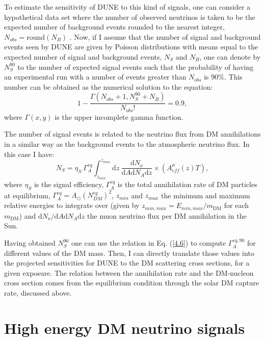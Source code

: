 To estimate the sensitivity of DUNE to this kind of signals, one can consider a hypothetical data set where the number of observed neutrinos is taken to be the expected number of background events rounded to the nearest integer, $N_{obs} = \mathrm{round}(N_{B})$ \cite{Cowan2010}. Now, if I assume that the number of signal and background events seen by DUNE are given by Poisson distributions with means equal to the expected number of signal and background events, $N_{S}$ and $N_{B}$, one can denote by $N_{S}^{90}$ to the number of expected signal events such that the probability of having an experimental run with a number of events greater than $N_{obs}$ is $90\%$. This number can be obtained as the numerical solution to the equation:
\begin{equation}\label{4.5}
	1 - \frac{\Gamma\left(N_{obs}+1, N_{S}^{90}+N_{B}\right)}{N_{obs}!} = 0.9,
\end{equation}
where $\Gamma(x,y)$ is the upper incomplete gamma function.

The number of signal events is related to the neutrino flux from DM annihilations in a similar way as the background events to the atmospheric neutrino flux. In this case I have:
\begin{equation}\label{4.6}
	N_{S} = \eta_{S} \ \Gamma_{A}^{eq} \int_{z_{min}}^{z_{max}} \mathrm{d}z \ \frac{\mathrm{d}N_{\nu}}{\mathrm{d}A \mathrm{d}N_{A} \mathrm{d}z}  \times \left(A_{eff}^{\mu}(z) T\right),
\end{equation}
where $\eta_{S}$ is the signal efficiency, $\Gamma_{A}^{eq}$ is the total annihilation rate of DM particles at equilibrium, $\Gamma_{A}^{eq} = A_{\odot} \left(N_{DM}^{eq}\right)^{2}$, $z_{min}$ and $z_{max}$ the minimum and maximum relative energies to integrate over (given by $z_{min, max} = E_{min, max}/m_{\mathrm{DM}}$ for each $m_{\mathrm{DM}}$) and $\mathrm{d}N_{\nu}/\mathrm{d}A \mathrm{d}N_{A} \mathrm{d}z$ the muon neutrino flux per DM annihilation in the Sun.

Having obtained $N_{S}^{90}$ one can use the relation in Eq. (\ref{4.6}) to compute $\Gamma_{A}^{eq,90}$ for different values of the DM mass. Then, I can directly translate those values into the projected sensitivities for DUNE to the DM scattering cross sections, for a given exposure. The relation between the annihilation rate and the DM-nucleon cross section comes from the equilibrium condition through the solar DM capture rate, discussed above.

\section{High energy DM neutrino signals}
\label{sec:dm_analysis_high_e_nu}

